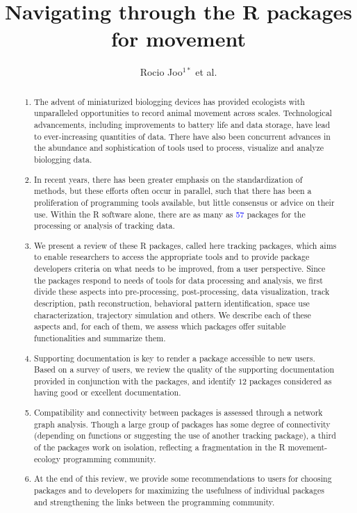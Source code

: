 \documentclass[a4paper,12pt]{article}
\title{Navigating through the R packages for movement}
\author{Rocio Joo$^{1*}$ et al.}
\begin{document}
\maketitle


\begin{abstract}
  \noindent \begin{enumerate}
  \item The advent of miniaturized biologging devices has provided ecologists with unparalleled opportunities to record animal movement across scales. Technological advancements, including improvements to battery life and data storage, have lead to ever-increasing quantities of data. There have also been concurrent advances in the abundance and sophistication of tools used to process, visualize and analyze biologging data.   
  \item In recent years, there has been greater emphasis on the standardization of methods, but these efforts often occur in parallel, such that there has been a proliferation of programming tools available, but little consensus or advice on their use. Within the R software alone, there are as many as \textcolor{blue}{57} packages for the processing or analysis of tracking data. 
  \item We present a review of these R packages, called here tracking packages, which aims to enable researchers to access the appropriate tools and to provide package developers criteria on what needs to be improved, from a user perspective. Since the packages respond to needs of tools for data processing and analysis, we first divide these aspects into pre-processing, post-processing, data visualization, track description, path reconstruction, behavioral pattern identification, space use characterization, trajectory simulation and others. We describe each of these aspects and, for each of them, we assess which packages offer suitable functionalities and summarize them. 
  \item Supporting documentation is key to render a package accessible to new users. Based on a survey of users, we review the quality of the supporting documentation provided in conjunction with the packages, and identify $12$ packages considered as having good or excellent documentation. 
  \item Compatibility and connectivity between packages is assessed through a network graph analysis. Though a large group of packages has some degree of connectivity (depending on functions or suggesting the use of another tracking package), a third of the packages work on isolation, reflecting a fragmentation in the R movement-ecology programming community. 
  \item At the end of this review, we provide some recommendations to users for choosing packages and to developers for maximizing the usefulness of individual packages and strengthening the links between the programming community. 
  \end{enumerate}
\end{abstract}
\end{document}
